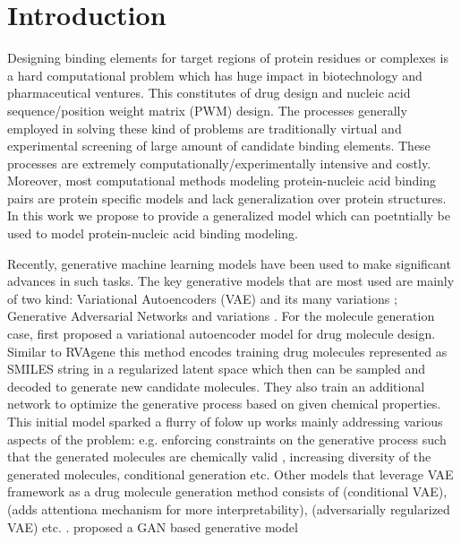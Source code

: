 \section{Introduction} 

Designing binding elements for target regions of protein residues or complexes is a hard
computational problem  which has huge impact in biotechnology and pharmaceutical ventures.
This constitutes of drug design and nucleic acid sequence/position weight matrix (PWM)
design. The processes generally employed in solving these kind of problems are traditionally virtual and
experimental screening of large amount of candidate binding elements. These processes are extremely
computationally/experimentally intensive and costly. Moreover, 
most computational methods modeling protein-nucleic acid binding pairs are protein specific models
and lack generalization over protein structures. In this work we propose to provide a generalized
model which can poetntially be used to model protein-nucleic acid binding modeling.
\par
Recently, generative machine learning models have
been used to make significant advances in such tasks. The key generative models that are most
used are mainly of two kind: Variational Autoencoders (VAE) \citep{Kingma2014} and its many
variations \citep{higgins2016beta, sohn2015learning,dilokthanakul2016deep}; Generative Adversarial
Networks \citep{goodfellow2014generative} and variations \citep{wang2018high,zhu2017unpaired}.
For the molecule generation case, \citet{gomez2018automatic} first proposed a variational autoencoder model for drug molecule design.
Similar to RVAgene  this method encodes training drug molecules represented as SMILES
\citep{weininger1988smiles} string in a regularized latent space which then can be sampled and
decoded to generate new candidate molecules. They also train an additional network to optimize the
generative process based on given chemical properties. This initial model sparked a flurry of folow up 
works mainly addressing various aspects of the problem: e.g. enforcing constraints on the generative process 
such that the generated molecules are chemically valid \citet{kusner2017grammar}, increasing diversity of the generated
molecules, conditional generation etc.  Other models that leverage VAE framework as a drug molecule
generation method consists of \citet{lim2018molecular} (conditional VAE), \citet{dollar2021giving}
(adds attentiona mechanism for more interpretability), \citet{hong2019molecular} (adversarially
regularized VAE) etc. . \citet{kadurin2017drugan} proposed a GAN based generative model
